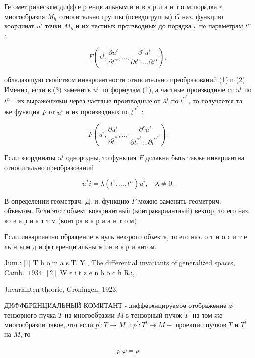 \documentclass[10pt]{article}
\begin{document}
Ге омет рическим дифф е р енци альным и н в а р и а н т о м порядка $r$ многообразия $M_{h}$ относительно группы (псевдогруппы) $G$ наз. функцию координат $u^{i}$ точки $M_{h}$ и их частных производных до порядка $r$ по параметрам $t^{\alpha}$ :



\[

F\left(u^{i}, \frac{\partial u^{i}}{\partial t^{\alpha}}, \ldots, \frac{\partial^{r} u^{i}}{\partial t^{\alpha_{1}} \ldots \partial t^{\alpha}}\right),

\]



обладающую свойством инвариантности относительно преобразований (1) и (2). Именно, если в (3) заменить $u^{i}$ по формулам (1), а частные производные от $u^{i}$ по $t^{\alpha}$ - их выражениями через частные производные от $\bar{u}^{i}$ по $\bar{t}^{\alpha^{*}}$, то получается та же функция $F$ от $\overline{u^{i}}$ и их производных по $\bar{t}^{\alpha^{*}}$ :



\[

F\left(u^{i}, \frac{\partial \bar{u}^{i}}{\partial \bar{t}^{*}}, \ldots, \frac{\partial^{r} \bar{u}^{i}}{\partial \bar{t}_{1}^{\alpha^{*}} \ldots \partial \bar{t}^{\alpha^{*}}}\right) .

\]



Если координаты $u^{i}$ однородны, то функция $F$ доләкна быть также инвариантна относительно преобразований



\[

u^{*} i=\lambda\left(t^{1}, \ldots, t^{n}\right) u^{i}, \quad \lambda \neq 0 .

\]



В определении геометрич. Д. и. функцию $F$ можно заменить геометрич. объектом. Если этот объект ковариантный (контравариантный) вектор, то его наз. ко в а р и а т т м (конт ра в а р и а н т о м).



Если инвариантно обращение в нуль нек-рого объекта, то его наз. о т н о с и т е ль н ы м д и фф еренци альны м ин в а р и антом.



Jum.: [1] T h o m a s T. Y., The differential invariants of generalized spaces, Camb., $1934 ;[2]$ W e i t z e n b ö c h R.:,

Jnvarianten-theorie, Groningen, 1923.



ДИФФЕРЕНЦИАЛЬНЫЙ КОМИТАНТ - дифференцируемое отображение $\varphi$ тензорного пучка $T$ на многообразии $M$ в тензорный пучок $T^{\prime}$ на том же многообразии такое, что если $p^{\prime}: T \rightarrow M$ и $p^{\prime}: T^{\prime} \rightarrow M-$ проекции пучков $T$ и $T^{\prime}$ на $M$, то



\[

p^{\prime} \varphi=p

\]
\end{document}
